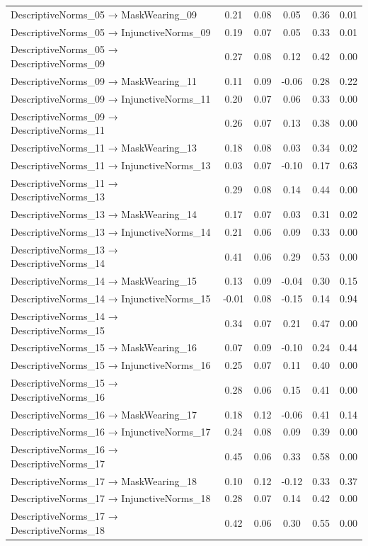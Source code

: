 \documentclass[
  man, donotrepeattitle,floatsintext]{apa6}
\begin{document}
\begin{center}
\begin{ThreePartTable}
{\begin{longtable}{lccccc}
DescriptiveNorms\_05 → MaskWearing\_09 & 0.21 & 0.08 & 0.05 & 0.36 & 0.01\\
DescriptiveNorms\_05 → InjunctiveNorms\_09 & 0.19 & 0.07 & 0.05 & 0.33 & 0.01\\
DescriptiveNorms\_05 → DescriptiveNorms\_09 & 0.27 & 0.08 & 0.12 & 0.42 & 0.00\\
DescriptiveNorms\_09 → MaskWearing\_11 & 0.11 & 0.09 & -0.06 & 0.28 & 0.22\\
DescriptiveNorms\_09 → InjunctiveNorms\_11 & 0.20 & 0.07 & 0.06 & 0.33 & 0.00\\
DescriptiveNorms\_09 → DescriptiveNorms\_11 & 0.26 & 0.07 & 0.13 & 0.38 & 0.00\\
DescriptiveNorms\_11 → MaskWearing\_13 & 0.18 & 0.08 & 0.03 & 0.34 & 0.02\\
DescriptiveNorms\_11 → InjunctiveNorms\_13 & 0.03 & 0.07 & -0.10 & 0.17 & 0.63\\
DescriptiveNorms\_11 → DescriptiveNorms\_13 & 0.29 & 0.08 & 0.14 & 0.44 & 0.00\\
DescriptiveNorms\_13 → MaskWearing\_14 & 0.17 & 0.07 & 0.03 & 0.31 & 0.02\\
DescriptiveNorms\_13 → InjunctiveNorms\_14 & 0.21 & 0.06 & 0.09 & 0.33 & 0.00\\
DescriptiveNorms\_13 → DescriptiveNorms\_14 & 0.41 & 0.06 & 0.29 & 0.53 & 0.00\\
DescriptiveNorms\_14 → MaskWearing\_15 & 0.13 & 0.09 & -0.04 & 0.30 & 0.15\\
DescriptiveNorms\_14 → InjunctiveNorms\_15 & -0.01 & 0.08 & -0.15 & 0.14 & 0.94\\
DescriptiveNorms\_14 → DescriptiveNorms\_15 & 0.34 & 0.07 & 0.21 & 0.47 & 0.00\\
DescriptiveNorms\_15 → MaskWearing\_16 & 0.07 & 0.09 & -0.10 & 0.24 & 0.44\\
DescriptiveNorms\_15 → InjunctiveNorms\_16 & 0.25 & 0.07 & 0.11 & 0.40 & 0.00\\
DescriptiveNorms\_15 → DescriptiveNorms\_16 & 0.28 & 0.06 & 0.15 & 0.41 & 0.00\\
DescriptiveNorms\_16 → MaskWearing\_17 & 0.18 & 0.12 & -0.06 & 0.41 & 0.14\\
DescriptiveNorms\_16 → InjunctiveNorms\_17 & 0.24 & 0.08 & 0.09 & 0.39 & 0.00\\
DescriptiveNorms\_16 → DescriptiveNorms\_17 & 0.45 & 0.06 & 0.33 & 0.58 & 0.00\\
DescriptiveNorms\_17 → MaskWearing\_18 & 0.10 & 0.12 & -0.12 & 0.33 & 0.37\\
DescriptiveNorms\_17 → InjunctiveNorms\_18 & 0.28 & 0.07 & 0.14 & 0.42 & 0.00\\
DescriptiveNorms\_17 → DescriptiveNorms\_18 & 0.42 & 0.06 & 0.30 & 0.55 & 0.00\\
\bottomrule
\end{longtable}

}

\end{ThreePartTable}
\end{center}
\end{document}

